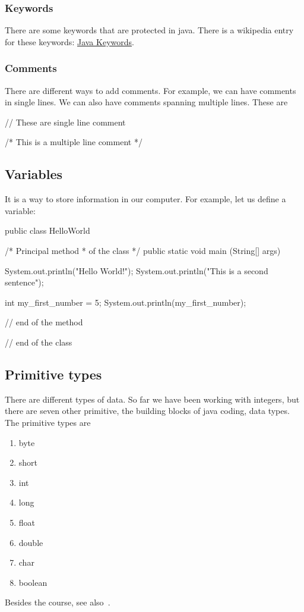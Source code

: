 \subsubsection{Keywords}

There are some keywords that are protected in java. There is a wikipedia entry for these keywords: 
\href{https://en.wikipedia.org/wiki/List_of_Java_keywords}{Java Keywords}.

\subsubsection{Comments}

There are different ways to add comments. For example, we can have comments in single lines. We can
also have comments spanning multiple lines. These are
\begin{listing}{1}
// These are single line comment

/* This is a 
multiple line comment */ 
\end{listing}

\subsection{Variables}

It is a way to store information in our computer. For example, let us define a variable:
\begin{listing}{1}
public class HelloWorld {
    /* Principal method 
     * of the class */
    public static void main (String[] args){
        System.out.println("Hello World!");
        System.out.println("This is a second sentence");

        int my_first_number = 5;
        System.out.println(my_first_number);
    }// end of the method
}// end of the class
\end{listing}

\subsection{Primitive types}

There are different types of data. So far we have been working with integers, but there are seven 
other primitive, the building blocks of java coding, data types. The primitive types are
\begin{enumerate}
    \item byte
    \item short
    \item int
    \item long
    \item float
    \item double
    \item char
    \item boolean
\end{enumerate}
Besides the course, see also~\cite{w3school}.

